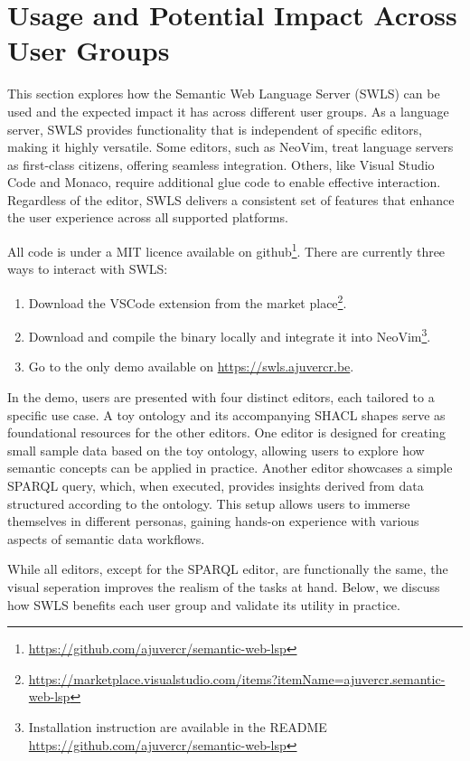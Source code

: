 \section{Usage and Potential Impact Across User Groups}%
\label{sec:usage}

This section explores how the Semantic Web Language Server (SWLS) can be used and the expected impact it has across different user groups.
As a language server, SWLS provides functionality that is independent of specific editors, making it highly versatile.
Some editors, such as NeoVim, treat language servers as first-class citizens, offering seamless integration.
Others, like Visual Studio Code and Monaco, require additional glue code to enable effective interaction.
Regardless of the editor, SWLS delivers a consistent set of features that enhance the user experience across all supported platforms.

All code is under a MIT licence available on github\footnote{\url{https://github.com/ajuvercr/semantic-web-lsp}}.
There are currently three ways to interact with SWLS:
\begin{enumerate}
  \item Download the VSCode extension from the market place\footnote{\url{https://marketplace.visualstudio.com/items?itemName=ajuvercr.semantic-web-lsp}}.
  \item Download and compile the binary locally and integrate it into NeoVim\footnote{Installation instruction are available in the README \url{https://github.com/ajuvercr/semantic-web-lsp}}.
  \item Go to the only demo available on \url{https://swls.ajuvercr.be}.
\end{enumerate}

In the demo, users are presented with four distinct editors, each tailored to a specific use case.
A toy ontology and its accompanying SHACL shapes serve as foundational resources for the other editors.
One editor is designed for creating small sample data based on the toy ontology, allowing users to explore how semantic concepts can be applied in practice.
Another editor showcases a simple SPARQL query, which, when executed, provides insights derived from data structured according to the ontology.
This setup allows users to immerse themselves in different personas, gaining hands-on experience with various aspects of semantic data workflows.

While all editors, except for the SPARQL editor, are functionally the same, 
the visual seperation improves the realism of the tasks at hand.
Below, we discuss how SWLS benefits each user group and validate its utility in practice.

